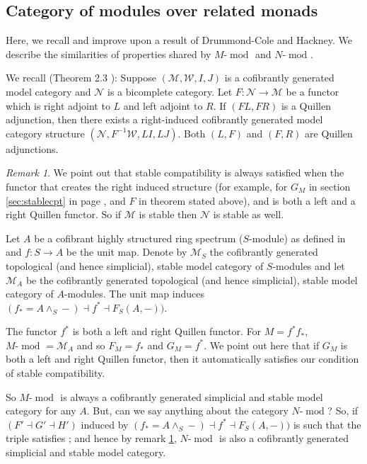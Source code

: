 \documentclass{article}
\newcommand{\module}[2][]{#2\text{-}\modop_{#1}}
\DeclareMathOperator{\modop}{mod}
\theoremstyle{definition}
\theoremstyle{remark}
\newtheorem{remark}[theorem]{Remark}
\begin{document}
\subsection{Category of modules over related monads} \label{ssc:drumhack}

Here, we recall and improve upon a result of Drummond-Cole and Hackney.  We describe the similarities of properties shared by $\module{M}$ and $\module{N}$.

    We recall (Theorem 2.3 \cite{MR3937590}): Suppose $(\mathcal{M},\mathcal{W},I,J)$ is a cofibrantly generated model category and $\mathcal{N}$ is a bicomplete category. Let $F: \mathcal{N} \rightarrow \mathcal{M}$ be a functor which is right adjoint to $L$ and left adjoint to $R$. If $(FL,FR)$ is a Quillen adjunction, then there exists a right-induced cofibrantly generated model category structure $(\mathcal{N},F^{-1}\mathcal{W},LI,LJ)$. Both $(L,F)$ and $(F,R)$ are Quillen adjunctions.
    

    \begin{remark} \label{rem:autostcy}
    We point out that stable compatibility is always satisfied when the functor that creates the right induced structure (for example, for $G_{M}$ in section \ref{sec:stablecpt} in page \pageref{itm:rtmodstr}, and $F$ in theorem stated above), and is both a left and a right Quillen functor. So if $\mathcal{M}$ is stable then $\mathcal{N}$ is stable as well.
    \end{remark}
    
Let  $A$ be a cofibrant highly structured ring spectrum ($S$-module)
as defined in \cite{MR1417719} and $f \colon S \rightarrow A$ be the unit map. 
Denote by 
$\mathcal{M}_{S}$ the cofibrantly generated topological (and hence simplicial), stable model category of $S$-modules and 
let $\mathcal{M}_{A}$ be the cofibrantly generated topological (and hence 
simplicial), stable model category of $A$-modules.  The unit map induces 
$(f_{*}=A \wedge_{S}-) \dashv f^{*} \dashv F_{S}(A,-))$.

The functor $f^{*}$ is both a left and right Quillen functor. For $M=f^{*}f_{*}$, $
\module{M} = \mathcal{M}_{A}$ and so $F_{M}=f_{*}$ and $G_{M}=f^{*}$. We point out 
here that if $G_{M}$ is both a left and right Quillen functor, then it automatically 
satisfies our condition of stable compatibility.

So $\module{M}$ is always a cofibrantly generated simplicial and stable model category for any $A$. But, can we say anything about the category $\module{N}$?
So, if $(F' \dashv G' \dashv H')$ induced by $(f_{*}=A \wedge_{S}-) \dashv f^{*} \dashv F_{S}(A,-))$  is such that the triple satisfies \cite[theorem 2.3]{MR3937590}; and hence by remark \ref{rem:autostcy}, $\module{N}$ is also a cofibrantly generated simplicial and stable model category.
\end{document}
